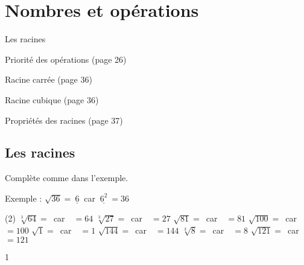 \documentclass[a4paper,11pt]{report}
\begin{document}
\newcommand{\chapterName}{Nombres et opérations}
\newcommand{\serieName}{Les racines}

\chapter*{\chapterName}
\thispagestyle{empty}

\begin{amL}{\serieName}{
\item Priorité des opérations (page 26)
\item Racine carrée (page 36)
\item Racine cubique (page 36)
\item Propriétés des racines (page 37)

}\end{amL}

\section*{\serieName}
\setcounter{page}{1}








\begin{exop}{
Complète comme dans l'exemple.

Exemple : $\sqrt{36}=\underline{~6~}$ car $\underline{~6^2~}=36$

\begin{tasks}(2)
    \task $\sqrt[3]{64}=$\hrulefill~car~\hrulefill ~$=64$
    \task $\sqrt[3]{27}=$\hrulefill~car~\hrulefill ~$=27$ 
    \task $\sqrt{81}=$\hrulefill~car~\hrulefill ~$=81$ 
    \task $\sqrt{100}=$\hrulefill~car~\hrulefill ~$=100$ 
    \task $\sqrt{1}=$\hrulefill~car~\hrulefill ~$=1$ 
    \task $\sqrt{144}=$\hrulefill~car~\hrulefill ~$=144$ 
    \task $\sqrt[3]{8}=$\hrulefill~car~\hrulefill ~$=8$ 
    \task $\sqrt{121}=$\hrulefill~car~\hrulefill ~$=121$ 
\end{tasks}
}{1}    
\end{exop}
\end{document}
